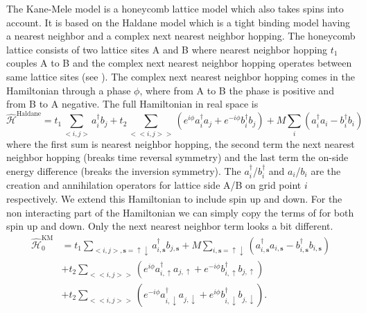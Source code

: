 \documentclass[a4paper,11pt]{report}
\begin{document}
The Kane-Mele model is a honeycomb lattice model which also takes spins into account. It is based on the Haldane model which is a tight binding model
having a nearest neighbor and a complex next nearest neighbor hopping. The honeycomb lattice consists of two lattice sites A and B where nearest
neighbor hopping $t_1$ couples A to B and the complex next nearest neighbor hopping operates between same lattice sites (see ).
The complex next nearest
neighbor hopping comes in the Hamiltonian through a phase $\phi$, where from A to B the phase is positive and from B to A negative. The full Hamiltonian in
real space is
\begin{equation}\label{eq:4}
 \hat{\mathcal{H}}^{\mathrm{Haldane}} = t_1\sum_{<i,j>}a_i^\dagger b_j + t_2\sum_{<<i,j>>}\left(e^{i\phi}a_i^\dagger a_j + e^{-i\phi}b_i^\dagger b_j\right)
 + M\sum_{i}\left(a_i^\dagger a_i - b_i^\dagger b_i\right)
\end{equation}
where the first sum is nearest neighbor hopping, the second term the next nearest neighbor hopping (breaks time reversal symmetry) and the last term 
the on-side energy difference (breaks the inversion symmetry). The $a_i^\dagger$/$b_i^\dagger$ and $a_i$/$b_i$ are the creation and annihilation operators for lattice side
A/B on grid point $i$ respectively. We extend this Hamiltonian to include spin up and down\cite{Kane2005}. For the non interacting part of the Hamiltonian we can simply
copy the terms of  for both spin up and down. Only the next nearest neighbor term looks a bit different.
\begin{equation}\label{eq:5}
\begin{split}
 \hat{\mathcal{H}}_0^{\mathrm{KM}} &= t_1\sum_{<i,j>,\bm{s} = \uparrow\downarrow}a_{i,\bm{s}}^\dagger b_{j,\bm{s}} 
 + M\sum_{i, \bm{s} = \uparrow\downarrow}\left(a_{i,\bm{s}}^\dagger a_{i,\bm{s}} - b_{i,\bm{s}}^\dagger b_{i,\bm{s}}\right)\\ 
 &+ t_2\sum_{<<i,j>>}\left(e^{i\phi}a_{i,\uparrow}^\dagger a_{j,\uparrow} + e^{-i\phi}b_{i,\uparrow}^\dagger b_{j,\uparrow}\right)\\ 
 &+ t_2\sum_{<<i,j>>}\left(e^{-i\phi}a_{i,\downarrow}^\dagger a_{j,\downarrow} + e^{i\phi}b_{i,\downarrow}^\dagger b_{j,\downarrow}\right).
\end{split}
\end{equation}
\end{document}
